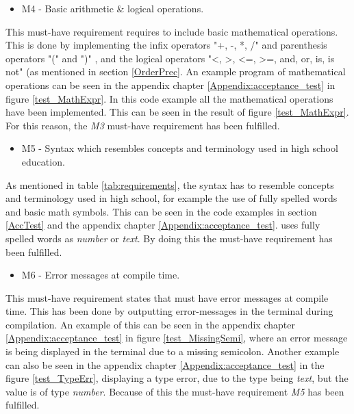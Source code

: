 \begin{itemize}
    \item M4 - Basic arithmetic \& logical operations.
\end{itemize}
This must-have requirement requires \lang to include basic mathematical operations. This is done by implementing the infix operators "+, -, *, /" and parenthesis operators "(" and ")" , and the logical operators "<, >, <=, >=, and, or, is, is not" (as mentioned in section \ref{OrderPrec}. An example program of mathematical operations can be seen in the appendix chapter \ref{Appendix:acceptance_test} in figure \ref{test_MathExpr}. In this code example all the mathematical operations have been implemented. This can be seen in the result of figure \ref{test_MathExpr}. For this reason, the \textit{M3} must-have requirement has been fulfilled.
\\
\begin{itemize}
    \item M5 - Syntax which resembles concepts and terminology used in
high school education.
\end{itemize}
As mentioned in table \ref{tab:requirements}, the syntax has to resemble concepts and terminology used in high school, for example the use of fully spelled words and basic math symbols. This can be seen in the code examples in section \ref{AccTest} and the appendix chapter \ref{Appendix:acceptance_test}. \lang uses fully spelled words as \textit{number} or \textit{text}. By doing this the must-have requirement has been fulfilled.
\\
\begin{itemize}
    \item M6 - Error messages at compile time.
\end{itemize}
This must-have requirement states that \lang must have error messages at compile time. This has been done by outputting error-messages in the terminal during compilation. An example of this can be seen in the appendix chapter \ref{Appendix:acceptance_test} in figure \ref{test_MissingSemi}, where an error message is being displayed in the terminal due to a missing semicolon. Another example can also be seen in the appendix chapter \ref{Appendix:acceptance_test} in the figure \ref{test_TypeErr}, displaying a type error, due to the type being \textit{text}, but the value is of type \textit{number}. Because of this the must-have requirement \textit{M5} has been fulfilled.

